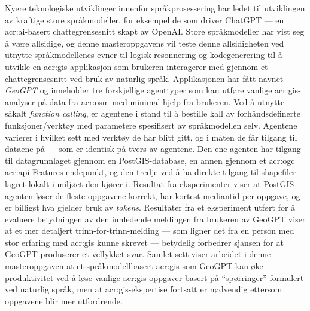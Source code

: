 Nyere teknologiske utviklinger innenfor språkprosessering har ledet til utviklingen av kraftige store språkmodeller, for eksempel de som driver ChatGPT --- en \acrshort{acr:ai}-basert chattegrensesnitt skapt av OpenAI. Store språkmodeller har vist seg å være allsidige, og denne masteroppgavens vil teste denne allsidigheten ved utnytte språkmodellenes evner til logisk resonnering og kodegenerering til å utvikle en \acrshort{acr:gis}-applikasjon som brukeren interagerer med gjennom et chattegrensesnitt ved bruk av naturlig språk. Applikasjonen har fått navnet \textit{GeoGPT} og inneholder tre forskjellige agenttyper som kan utføre vanlige \acrshort{acr:gis}-analyser på data fra \gls{acr:osm} med minimal hjelp fra brukeren. Ved å utnytte såkalt \textit{function calling}, er agentene i stand til å bestille kall av forhåndsdefinerte funksjoner/verktøy med parametere spesifisert av språkmodellen selv. Agentene varierer i hvilket sett med verktøy de har blitt gitt, og i måten de får tilgang til dataene på --- som er identisk på tvers av agentene. Den ene agenten har tilgang til datagrunnlaget gjennom en PostGIS-database, en annen gjennom et \acrshort{acr:ogc} \acrshort{acr:api} Features-endepunkt, og den tredje ved å ha direkte tilgang til shapefiler lagret lokalt i miljøet den kjører i. Resultat fra eksperimenter viser at PostGIS-agenten løser de fleste oppgavene korrekt, har kortest mediantid per oppgave, og er billigst hva gjelder bruk av \textit{tokens}. Resultater fra et eksperiment utført for å evaluere betydningen av den innledende meldingen fra brukeren av GeoGPT viser at et mer detaljert trinn-for-trinn-melding --- som ligner det fra en person med stor erfaring med \acrshort{acr:gis} kunne skrevet --- betydelig forbedrer sjansen for at GeoGPT produserer et vellykket svar. Samlet sett viser arbeidet i denne masteroppgaven at et språkmodellbasert \acrshort{acr:gis} som GeoGPT kan øke produktivitet ved å løse vanlige \acrshort{acr:gis}-oppgaver basert på \enquote{spørringer} formulert ved naturlig språk, men at \acrshort{acr:gis}-ekspertise fortsatt er nødvendig ettersom oppgavene blir mer utfordrende.